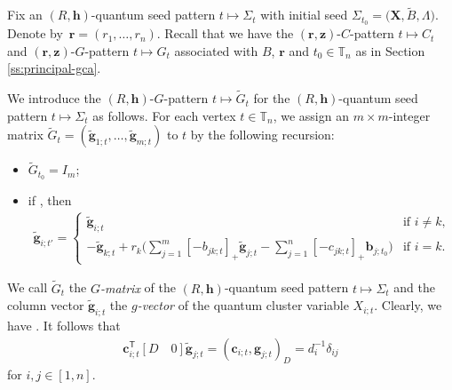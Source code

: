\documentclass[10pt,a4paper]{amsart}
\numberwithin{equation}{section}
\begin{document}
Fix an $(R,\mathbf{h})$-quantum seed pattern $t\mapsto \Sigma_t$ with initial seed $\Sigma_{t_0}=\bigl(\mathbf{X},\tilde{B},\Lambda\bigr)$. Denote by~${\mathbf{r}=(r_1,\dots, r_n)}$. Recall that we have the $(\mathbf{r},\mathbf{z})$-$C$-pattern $t\mapsto C_t$ and $(\mathbf{r},\mathbf{z})$-$G$-pattern $t\mapsto G_t$ associated with $B$, $\mathbf{r}$ and $t_0\in \mathbb{T}_n$ as in Section \ref{ss:principal-gca}.

We introduce the $(R,\mathbf{h})$-$G$-pattern $t\mapsto \tilde{G}_t$ for the $(R,\mathbf{h})$-quantum seed pattern $t\mapsto \Sigma_t$ as follows.
 For each vertex $t\in \mathbb{T}_n$, we assign an $m\times m$-integer matrix $\tilde{G}_t=(\tilde{\mathbf{g}}_{1;t},\dots, \tilde{\mathbf{g}}_{m;t})$ to $t$ by the following recursion:
\begin{itemize}\itemsep=0pt
 \item[(1)] $\tilde{G}_{t_0}=I_m$;
 \item[(2)] if , then
 \begin{align}\label{eq:g-formula}
 \mathbf{\tilde{g}}_{i;t'}=
 \begin{cases}
 \mathbf{\tilde{g}}_{i;t} & \text{if } i\neq k,\\
 \displaystyle -\mathbf{\tilde{g}}_{k;t}+r_{k}\biggl(\sum\limits_{j=1}^{m}[-b_{jk;t}]_+\mathbf{\tilde{g}}_{j;t}-\sum\limits_{j=1}^{n}[- c_{jk;t}]_+\mathbf{b}_{j;t_0}\biggr) & \text{if }i=k.
 \end{cases}
 \end{align}

\end{itemize}
We call $\tilde{G}_t$ the {\it $G$-matrix} of the $(R,\mathbf{h})$-quantum seed pattern $t\mapsto \Sigma_t$ and the column vector $\tilde{\mathbf{g}}_{i;t}$ the {\it $g$-vector} of the quantum cluster variable $X_{i;t}$.
Clearly, we have . It follows that
\begin{align}\label{D_form_duality}
 \mathbf{c}^{\mathsf T}_{i;t}[D\quad 0]\mathbf{\tilde{g}}_{j;t}=(\mathbf{c}_{i;t},\mathbf{g}_{j;t})_D=d_{i}^{-1}\delta_{ij}
\end{align}
for $i,j\in[1,n]$.
\end{document}
